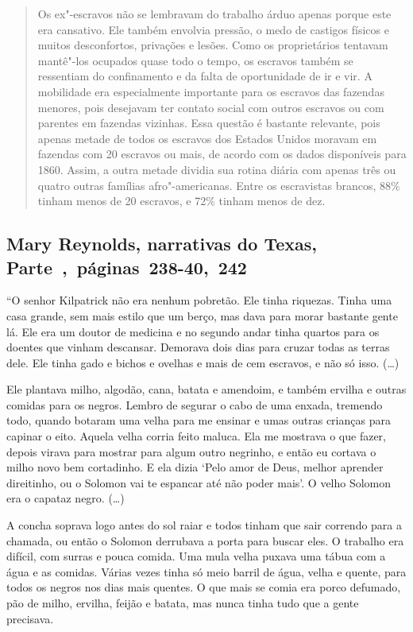 \begin{quote}
Os ex"-escravos não se lembravam do trabalho árduo apenas porque
este era cansativo. Ele também envolvia pressão, o medo de castigos
físicos e muitos desconfortos, privações e lesões. Como os proprietários
tentavam mantê"-los ocupados quase todo o tempo, os escravos também se
ressentiam do confinamento e da falta de oportunidade de ir e vir. A
mobilidade era especialmente importante para os escravos das fazendas
menores, pois desejavam ter contato social com outros escravos ou com
parentes em fazendas vizinhas. Essa questão é bastante relevante, pois
apenas metade de todos os escravos dos Estados Unidos moravam em
fazendas com 20 escravos ou mais, de acordo com os dados disponíveis
para 1860. Assim, a outra metade dividia sua rotina diária com apenas
três ou quatro outras famílias afro"-americanas. Entre os escravistas
brancos, 88\% tinham menos de 20 escravos, e 72\% tinham menos de dez.
\end{quote}

\subsection{Mary Reynolds, narrativas do Texas, Parte~,~páginas~238-40,~242}
\label{ref222}

``O senhor Kilpatrick não era nenhum pobretão. Ele tinha riquezas. Tinha
uma casa grande, sem mais estilo que um berço, mas dava para morar
bastante gente lá. Ele era um doutor de medicina e no segundo andar
tinha quartos para os doentes que vinham descansar. Demorava dois dias
para cruzar todas as terras dele. Ele tinha gado e bichos e ovelhas e
mais de cem escravos, e não só isso. (\ldots{})

Ele plantava milho, algodão, cana, batata e amendoim, e também ervilha e
outras comidas para os negros. Lembro de segurar o cabo de uma enxada,
tremendo todo, quando botaram uma velha para me ensinar e umas outras
crianças para capinar o eito. Aquela velha corria feito maluca. Ela me
mostrava o que fazer, depois virava para mostrar para algum outro
negrinho, e então eu cortava o milho novo bem cortadinho. E ela dizia
`Pelo amor de Deus, melhor aprender direitinho, ou o Solomon vai te
espancar até não poder mais'. O velho Solomon era o capataz negro.
(\ldots{})

A concha soprava logo antes do sol raiar e todos tinham que sair
correndo para a chamada, ou então o Solomon derrubava a porta para
buscar eles. O trabalho era difícil, com surras e pouca comida. Uma mula
velha puxava uma tábua com a água e as comidas. Várias vezes tinha só
meio barril de água, velha e quente, para todos os negros nos dias mais
quentes. O que mais se comia era porco defumado, pão de milho, ervilha,
feijão e batata, mas nunca tinha tudo que a gente precisava.

